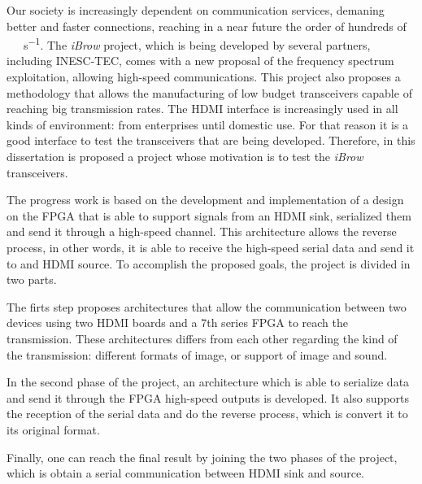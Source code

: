 Our society is increasingly dependent on communication services, demaning better and faster connections, reaching in a near future the order of hundreds of \SI{}{\giga\bit\per\second}. The \textit{iBrow} project, which is being developed by several partners, including INESC-TEC, comes with a new proposal of the frequency spectrum exploitation, allowing high-speed communications. This project also proposes a methodology that allows the manufacturing of low budget transceivers capable of reaching big transmission rates. The HDMI interface is increasingly used in all kinds of environment: from enterprises until domestic use. For that reason it is a good interface to test the transceivers that are being developed. Therefore, in this dissertation is proposed a project whose motivation is to test the \textit{iBrow} transceivers.

The progress work is based on the development and implementation of a design on the FPGA that is able to support signals from an HDMI sink, serialized them and send it through a high-speed channel. This architecture allows the reverse process, in other words, it is able to receive the high-speed serial data and send it to and HDMI source. To accomplish the proposed goals, the project is divided in two parts.

The firts step proposes architectures that allow the communication between two devices using two HDMI boards and a 7th series FPGA to reach the transmission. These architectures differs from each other regarding the kind of the transmission: different formats of image, or support of image and sound.

In the second phase of the project, an architecture which is able to serialize data and send it through the FPGA high-speed outputs is developed. It also supports the reception of the serial data and do the reverse process, which is convert it to its original format.

Finally, one can reach the final result by joining the two phases of the project, which is obtain a serial communication between HDMI sink and source.


